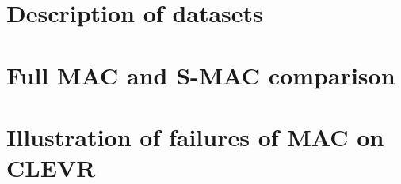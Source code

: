 \appendix

\section{Description of datasets}

\section{Full MAC and S-MAC comparison}

\section{Illustration of failures of MAC on CLEVR}